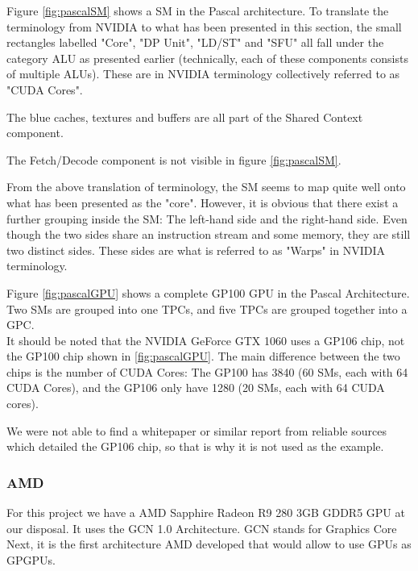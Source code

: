 Figure \ref{fig:pascalSM} shows a \gls{SM} in the Pascal architecture.
To translate the terminology from NVIDIA to what has been presented in this section, the small rectangles labelled "Core", "DP Unit", "LD/ST" and "SFU" all fall under the category \gls{ALU} as presented earlier (technically, each of these components consists of multiple \glspl{ALU}).
These are in NVIDIA terminology collectively referred to as "CUDA Cores".

The blue caches, textures and buffers are all part of the Shared Context component.

The Fetch/Decode component is not visible in figure \ref{fig:pascalSM}.

From the above translation of terminology, the \gls{SM} seems to map quite well onto what has been presented as the "core".
However, it is obvious that there exist a further grouping inside the \gls{SM}: The left-hand side and the right-hand side.
Even though the two sides share an instruction stream and some memory, they are still two distinct sides.
These sides are what is referred to as "Warps" in NVIDIA terminology.


Figure \ref{fig:pascalGPU} shows a complete GP100 GPU in the Pascal Architecture.
Two \glspl{SM} are grouped into one \glspl{TPC}, and five \glspl{TPC} are grouped together into a \gls{GPC}. \\

It should be noted that the NVIDIA GeForce GTX 1060 uses a GP106 chip, not the GP100 chip shown in \ref{fig:pascalGPU}. 
The main difference between the two chips is the number of CUDA Cores: The GP100 has 3840 (60 \glspl{SM}, each with 64 CUDA Cores), and the GP106 only have 1280 (20 \glspl{SM}, each with 64 CUDA cores).

We were not able to find a whitepaper or similar report from reliable sources which detailed the GP106 chip, so that is why it is not used as the example. 


\subsubsection{AMD}
For this project we have a AMD Sapphire Radeon R9 280 3GB GDDR5 \gls{GPU} at our disposal. It uses the GCN 1.0 Architecture.
GCN stands for Graphics Core Next, it is the first architecture AMD developed that would allow to use \glspl{GPU} as \glspl{GPGPU}.

